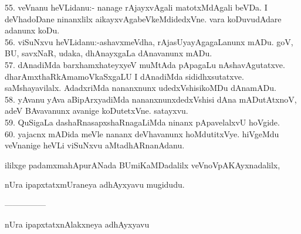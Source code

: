 \documentclass{article}
\begin{document}
55. veVnanu heVLidanu:- nanage rAjayxvAgali matotxMdAgali beVDa. I deVhadoDane ninanxlilx aikayxvAgabeVkeMdidedxVne. vara koDuvudAdare adanunx koDu.\\
56. viSuNxvu heVLidanu:-ashavxmeVdha, rAjasUyayAgagaLanunx mADu. goV, BU, savxNaR, udaka, dhAnayxgaLa dAnavanunx mADu.\\
57. dAnadiMda barxhamxhateyxyeV muMtAda pApagaLu nAshavAgutatxve. dharAmxthaRkAmamoVkaSxgaLU I dAnadiMda sididhxsutatxve. saMshayavilalx. AdadxriMda nananxnunx udedxVshisikoMDu dAnamADu.\\
58. yAvanu yAva aBipArxyadiMda nananxnunxdedxVshisi dAna mADutAtxnoV, adeV BAvavanunx avanige koDutetxVne. satayxvu.\\
59. QuSigaLa dashaRnasapxshaRnagaLiMda ninanx pApavelalxvU hoVgide.\\
60. yajacnx mADida meVle nananx deVhavanunx hoMdutitxVye. hiVgeMdu veVnanige heVLi viSuNxvu aMtadhARnanAdanu.

\begin{center}
ililxge padamxmahApurANada BUmiKaMDadalilx veVnoVpAKAyxnadalilx,
\end{center}

\begin{center}
nUra ipapxtatxmUraneya adhAyxyavu mugidudu.
\end{center}

\begin{center}
---------------
\end{center}

\begin{center}
nUra ipapxtatxnAlakxneya adhAyxyavu
\end{center}
\end{document}
